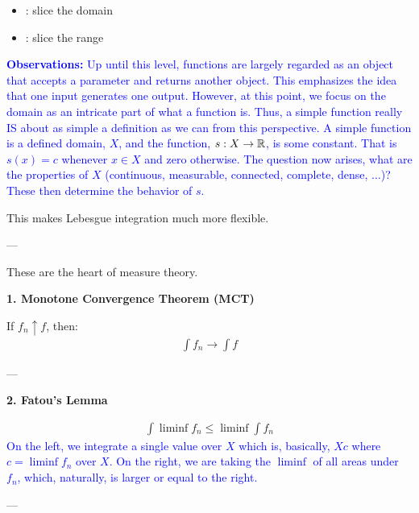 \documentclass[12pt,a4paper]{report}
\newcommand{\BLUE}[1]{\textcolor{blue}{#1}}
\begin{document}
\begin{description}
\begin{description}
		\begin{itemize}
        \item {}: slice the domain
        \item {}: slice the range
		\end{itemize}

\BLUE{
		\item \textbf{Observations: } Up until this level, functions are largely regarded as an object that accepts a parameter and returns another object.  This emphasizes the idea that one input generates one output.  However, at this point, we focus on the domain as an intricate part of what a function is.  Thus, a simple function really IS about as simple a definition as we can from this perspective.  A simple function is a defined domain, $X$, and the function, $s: X \to \mathbb{R}$, is some constant.  That is $s(x)=c$ whenever $x \in X$ and zero otherwise.  The question now arises, what are the properties of $X$ (continuous, measurable, connected, complete, dense, $\dots$)?  These then determine the behavior of $s$.
}

	\end{description}

This makes Lebesgue integration much more flexible.

---

\item {}

These are the heart of measure theory.

	\begin{description}
    \item \textbf{1. Monotone Convergence Theorem (MCT)}

If $f_n \uparrow f$, then:
\begin{align*}
\int f_n \to \int f
\end{align*}

---

    \item \textbf{2. Fatou’s Lemma}

\begin{align*}
\int \liminf f_n \le \liminf \int f_n
\end{align*}\BLUE{On the left, we integrate a single value over $X$ which is, basically, $Xc$ where $c = \liminf f_n$ over $X$.  On the right, we are taking the $\liminf$ of all areas under $f_n$, which, naturally, is larger or equal to the right.}

---


\end{description}
\end{description}
\end{document}
